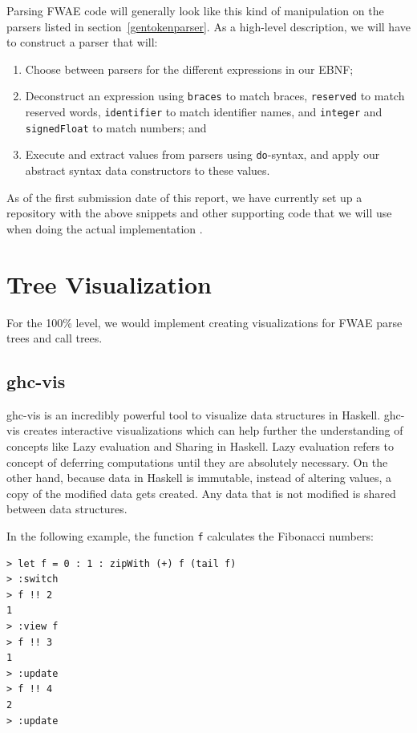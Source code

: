 \documentclass[format=acmlarge, review=false, nonacm=false, screen=true]{acmart}
\begin{document}
Parsing FWAE code will generally look like this kind of manipulation on the parsers listed in section~\ref{gentokenparser}. As a high-level description, we will have to construct a parser that will:
\begin{enumerate}
    \item Choose between parsers for the different expressions in our EBNF;
    \item Deconstruct an expression using \texttt{braces} to match braces, \texttt{reserved} to match reserved words, \texttt{identifier} to match identifier names, and \texttt{integer} and \texttt{signedFloat} to match numbers; and
    \item Execute and extract values from parsers using \texttt{do}-syntax, and apply our abstract syntax data constructors to these values.
\end{enumerate}

As of the first submission date of this report, we have currently set up a repository with the above snippets and other supporting code that we will use when doing the actual implementation \cite{fwae-parser}.


\section{Tree Visualization}
For the 100\% level, we would implement creating visualizations for FWAE parse trees and call trees.
\subsection{ghc-vis}
ghc-vis is an incredibly powerful tool to visualize data structures in Haskell. ghc-vis creates interactive visualizations which can help further the understanding of concepts like Lazy evaluation and Sharing in Haskell. Lazy evaluation refers to concept of deferring computations until they are absolutely necessary. On the other hand, because data in Haskell is immutable, instead of altering values, a copy of the modified data gets created. Any data that is not modified is shared between data structures.

In the following example, the function \texttt{f} calculates the Fibonacci numbers:
\begin{verbatim}
> let f = 0 : 1 : zipWith (+) f (tail f)
> :switch
> f !! 2
1
> :view f
> f !! 3
1
> :update
> f !! 4
2
> :update
\end{verbatim}
\end{document}
